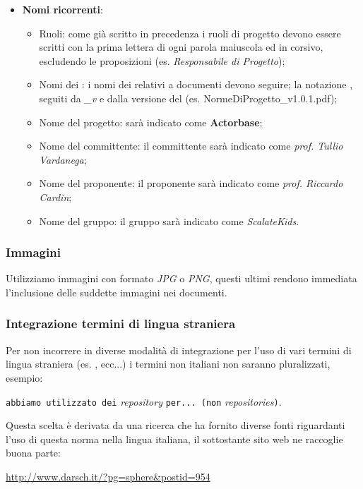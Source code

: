 \documentclass{scalatekids-article}
\begin{document}
\begin{itemize}
\item \textbf{Nomi ricorrenti}:
  \begin{itemize}
  \item Ruoli: come già scritto in precedenza i ruoli di progetto devono essere scritti con la prima lettera di ogni parola maiuscola ed in corsivo, escludendo le proposizioni (es. \textit{Responsabile di Progetto});
  \item Nomi dei : i nomi dei  relativi a documenti devono seguire;
    la notazione \textit{}, seguiti da \textit{\_v} e dalla
    versione del  (es. NormeDiProgetto\_v1.0.1.pdf);
  \item Nome del progetto: sarà indicato come \textbf{Actorbase};
  \item Nome del committente: il committente sarà indicato come \textit{prof. Tullio Vardanega};
  \item Nome del proponente: il proponente sarà indicato come \textit{prof. Riccardo Cardin};
  \item Nome del gruppo: il gruppo sarà indicato come \textit{ScalateKids}.
  \end{itemize}
\end{itemize}

\subsubsection{Immagini}
Utilizziamo immagini con formato \textit{JPG} o \textit{PNG}, questi ultimi rendono immediata l'inclusione delle suddette immagini nei documenti.

\subsubsection{Integrazione termini di lingua straniera}
Per non incorrere in diverse modalità di integrazione per l'uso di vari termini di lingua straniera (es. ,  ecc...) i termini non italiani non saranno pluralizzati, esempio:\\
\begin{center}
  \verb=abbiamo utilizzato dei= \textit{repository} \verb=per... (non= \textit{repositories}\verb=)=.
\end{center}
Questa scelta è derivata da una ricerca che ha fornito diverse fonti riguardanti l'uso di questa norma nella lingua italiana, il sottostante sito web ne raccoglie buona parte:\\
\begin{center}
  \url{http://www.darsch.it/?pg=sphere&postid=954}
\end{center}
\end{document}
